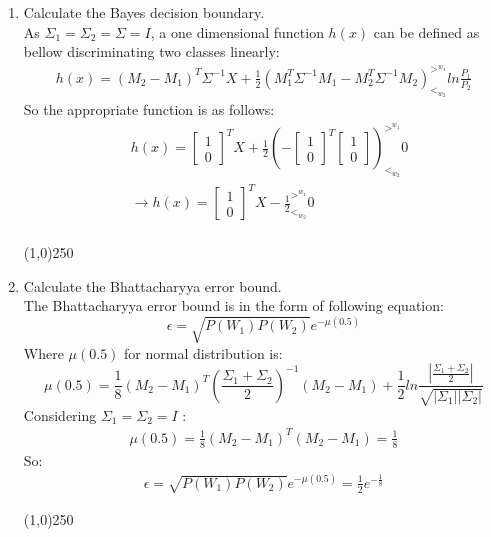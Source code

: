 \documentclass[12pt]{article}
\newcommand{\gl}{^{>^{w_1}}_{<_{w_2}}}
\newcommand{\svector}[2]{\left[ \begin{matrix} #1 \\ #2 \end{matrix}\right]}
\begin{document}
\begin{enumerate}
\item Calculate the Bayes decision boundary.\\
As $\Sigma_1 = \Sigma_2 = \Sigma = I$, a one dimensional function $h(x)$ can be defined as bellow discriminating two classes linearly:
\begin{align*}
h(x) = (M_2 - M_1)^T\Sigma^{-1}X + \frac{1}{2}(M_1^T\Sigma^{-1}M_1 - M_2^T\Sigma^{-1}M_2)\gl ln \frac{P_1}{P_2}
\end{align*}
So the appropriate function is as follows:
\begin{align*}
&h(x) = \svector{1}{0}^TX + \frac{1}{2}( - \svector{1}{0}^T\svector{1}{0})\gl 0 \\
&\rightarrow h(x) = \svector{1}{0}^TX - \frac{1}{2}\gl 0 \\
\end{align*}

\begin{center}
\line(1,0){250}
\end{center}

\item Calculate the Bhattacharyya error bound.\\
The Bhattacharyya error bound is in the form of following equation:
\begin{equation}
\epsilon = \sqrt{P(W_1)P(W_2)}e^{-\mu(0.5)}
\end{equation}
Where $\mu(0.5)$ for normal distribution is:
\begin{equation}
\mu(0.5) = \frac{1}{8} (M_2 - M_1)^T (\frac{\Sigma_1 + \Sigma_2}{2})^{-1} (M_2 - M_1) + \frac{1}{2} ln \frac{|\frac{\Sigma_1 + \Sigma_2}{2}|}{\sqrt{|\Sigma_1||\Sigma_2|}}
\end{equation}
Considering $\Sigma_1 = \Sigma_2 = I$ :
\begin{align*}
\mu(0.5) = \frac{1}{8} (M_2 - M_1)^T (M_2 - M_1) = \frac{1}{8}
\end{align*}
So:
\begin{align*}
\epsilon = \sqrt{P(W_1)P(W_2)}e^{-\mu(0.5)} = \frac{1}{2}e^{-\frac{1}{8}}
\end{align*}



\begin{center}
\line(1,0){250}
\end{center}


\end{enumerate}
\end{document}
